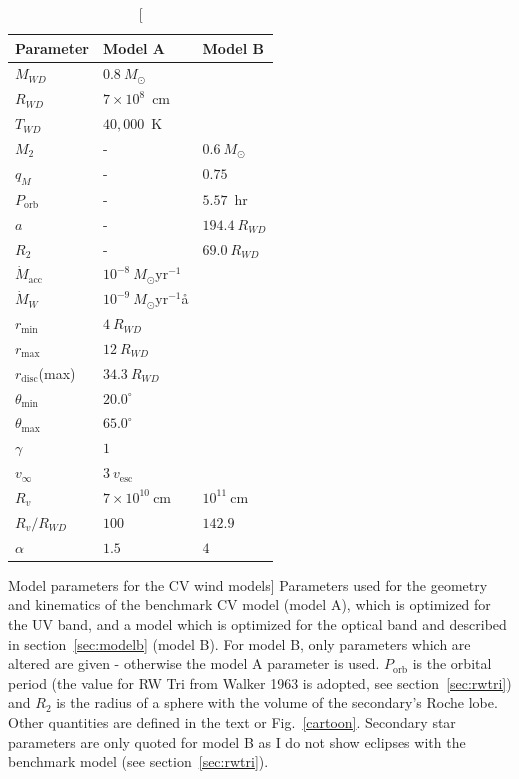 %
%


\begin{table}
\centering
\begin{tabular}{p{2cm}p{2cm}p{2cm}}
\hline Parameter 	&	 Model A  & Model B \\ 
\hline \hline 
$M_{WD}$ 	 &	 $0.8~M_{\odot}$  &     \\ 
$R_{WD}$ 	 &	 $7\times10^{8}$~cm  & \\ 
$T_{WD}$ 	 &	 $40,000$~K        &  \\
$M_{2}$ 	& -&	 $0.6~M_{\odot}$   \\ 
$q_M$ 	&- &	 $0.75$   \\ 
$P_{\mathrm{orb}}$ 	&- &	 $5.57$~hr   \\ 
$a$ 	& -&	 $194.4~R_{WD}$   \\ 
$R_2$   &   -  &	 $69.0~R_{WD}$  \\ 
$\dot{M}_{\mathrm{acc}}$ 	 &	 $10^{-8}~M_{\odot}\mathrm{yr}^{-1}$  &\\ 
$\dot{M}_W$  &	$10^{-9}~M_{\odot}\mathrm{yr}^{-1}$å  & \\ 
$r_{\mathrm{min}}$ 	&	 $4~R_{WD}$ &  \\ 
$r_{\mathrm{max}}$ 	&	 $12~R_{WD}$  &  \\ 
$r_{\mathrm{disc}}$(max) 	&	 $34.3~R_{WD}$  &  \\ 
$\theta_{\mathrm{min}}$	&	 $20.0^{\circ}$  &  \\ 
$\theta_{\mathrm{max}}$ 	&	 $65.0^{\circ}$  &  \\ 
$\gamma$ 	&	 $1$  &  \\ 
$v_{\infty}$ 	&	 $3~v_{\mathrm{esc}}$  &  \\ 
$R_v$ 	        &	 $7\times10^{10}~\mathrm{cm}$  &  $10^{11}~\mathrm{cm}$  \\ 
$R_v / R_{WD}$ 	&	 $100$  &  $142.9$  \\ 
$\alpha$ 	&	 $1.5$   &   $4$\\
\hline 
\end{tabular} 
\centering
\caption
[Model parameters for the CV wind models]
{
Parameters used for the geometry and kinematics of the benchmark 
CV model (model A), which is optimized for the UV band, and a model
which is optimized for the optical band and described in section~\ref{sec:modelb} (model B).
For model B, only parameters which are altered are given - otherwise the
model A parameter is used. $P_{\mathrm{orb}}$ is the orbital period 
(the value for RW Tri from Walker 1963 is adopted, see section~\ref{sec:rwtri}) and 
$R_2$ is the radius of a sphere with the volume of the secondary's Roche lobe. 
Other quantities are defined in the text or Fig.~\ref{cartoon}.
Secondary star parameters are only quoted for 
model B as I do not show eclipses with the 
benchmark model (see section~\ref{sec:rwtri}).
}
\label{wind_param}
\label{modelb_table}
\end{table}

